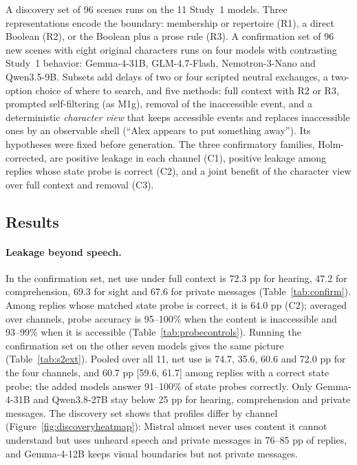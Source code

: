 \documentclass[11pt]{article}
\begin{document}
A discovery set of 96 scenes runs on the 11 Study~1 models. Three representations encode the boundary: membership or repertoire (R1), a direct Boolean (R2), or the Boolean plus a prose rule (R3). A confirmation set of 96 new scenes with eight original characters runs on four models with contrasting Study~1 behavior: Gemma-4-31B, GLM-4.7-Flash, Nemotron-3-Nano and Qwen3.5-9B. Subsets add delays of two or four scripted neutral exchanges, a two-option choice of where to search, and five methods: full context with R2 or R3, prompted self-filtering (as M1g), removal of the inaccessible event, and a deterministic \emph{character view} that keeps accessible events and replaces inaccessible ones by an observable shell (``Alex appears to put something away''). Its hypotheses were fixed before generation. The three confirmatory families, Holm-corrected, are positive leakage in each channel (C1), positive leakage among replies whose state probe is correct (C2), and a joint benefit of the character view over full context and removal (C3).


\subsection{Results}
\paragraph{Leakage beyond speech.} In the confirmation set, net use under full context is 72.3 pp for hearing, 47.2 for comprehension, 69.3 for sight and 67.6 for private messages (Table~\ref{tab:confirm}). Among replies whose matched state probe is correct, it is 64.0 pp (C2); averaged over channels, probe accuracy is 95--100\% when the content is inaccessible and 93--99\% when it is accessible (Table~\ref{tab:probecontrols}). Running the confirmation set on the other seven models gives the same picture (Table~\ref{tab:s2ext}). Pooled over all 11, net use is 74.7, 35.6, 60.6 and 72.0 pp for the four channels, and 60.7 pp [59.6, 61.7] among replies with a correct state probe; the added models answer 91--100\% of state probes correctly. Only Gemma-4-31B and Qwen3.8-27B stay below 25 pp for hearing, comprehension and private messages. The discovery set shows that profiles differ by channel (Figure~\ref{fig:discoveryheatmap}): Mistral almost never uses content it cannot understand but uses unheard speech and private messages in 76--85 pp of replies, and Gemma-4-12B keeps visual boundaries but not private messages.
\end{document}
